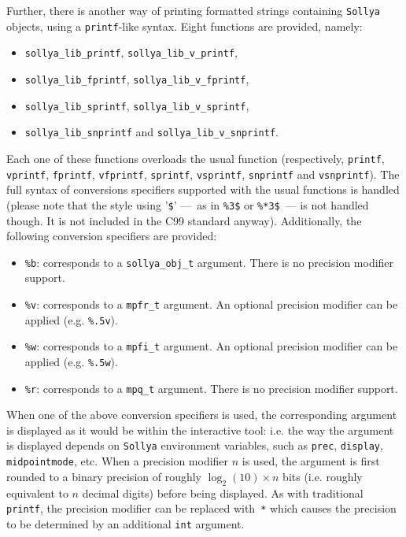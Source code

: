 \documentclass[a4paper]{article}
\newcommand{\sollya}{\texttt{Sollya}\xspace}
\begin{document}
Further, there is another way of printing formatted strings containing \sollya objects, using a {\tt printf}-like syntax. Eight functions are provided, namely:
\begin{itemize}
\item \verb|sollya_lib_printf|, \verb|sollya_lib_v_printf|,
\item \verb|sollya_lib_fprintf|, \verb|sollya_lib_v_fprintf|,
\item \verb|sollya_lib_sprintf|, \verb|sollya_lib_v_sprintf|,
\item \verb|sollya_lib_snprintf| and \verb|sollya_lib_v_snprintf|.
\end{itemize}
Each one of these functions overloads the usual function (respectively, \verb|printf|, \verb|vprintf|, \verb|fprintf|, \verb|vfprintf|, \verb|sprintf|, \verb|vsprintf|, \verb|snprintf| and \verb|vsnprintf|). The full syntax of conversions specifiers supported with the usual functions is handled (please note that the style using '\verb|$|' ---~as in \verb|%3$| or \verb|%*3$|~--- is not handled though. It is not included in the C99 standard anyway). Additionally, the following conversion specifiers are provided:
\begin{itemize}
\item \verb|%b|: corresponds to a \verb|sollya_obj_t| argument. There is no precision modifier support.
\item \verb|%v|: corresponds to a \verb|mpfr_t| argument. An optional precision modifier can be applied (e.g. \verb|%.5v|).
\item \verb|%w|: corresponds to a \verb|mpfi_t| argument. An optional precision modifier can be applied (e.g. \verb|%.5w|).
\item \verb|%r|: corresponds to a \verb|mpq_t| argument. There is no precision modifier support.
\end{itemize}
When one of the above conversion specifiers is used, the corresponding argument is displayed as it would be within the interactive tool: i.e. the way the argument is displayed depends on \sollya environment variables, such as \verb|prec|, \verb|display|, \verb|midpointmode|, etc. When a precision modifier $n$ is used, the argument is first rounded to a binary precision of roughly $\log_2(10)\times n$ bits (i.e. roughly equivalent to $n$ decimal digits) before being displayed. As with traditional \verb|printf|, the precision modifier can be replaced with~\verb|*| which causes the precision to be determined by an additional \verb|int| argument.
\end{document}
